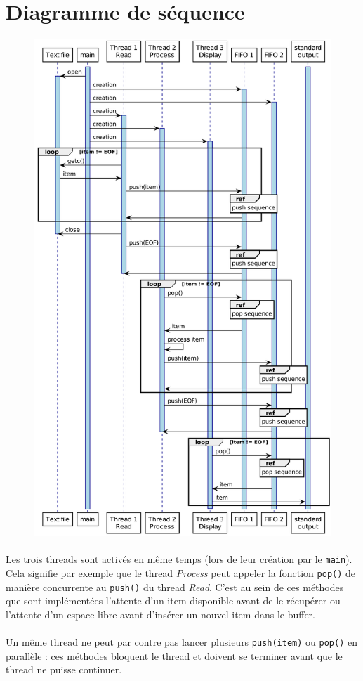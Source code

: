 \documentclass{article}
\begin{document}
    \newpage
    \section{Diagramme de séquence}

    \begin{figure}[H]
        \centering
        \includegraphics[width=.65\textwidth]{./diagrammes/sequence_full/prodcon-full-sequence.png}
    \end{figure}

    \paragraph{}
    Les trois threads sont activés en même temps (lors de leur création par le \texttt{main}). Cela signifie par exemple que le thread \emph{Process} peut appeler la fonction \texttt{pop()} de manière concurrente au \texttt{push()} du thread \emph{Read}. C'est au sein de ces méthodes que sont implémentées l'attente d'un item disponible avant de le récupérer ou l'attente d'un espace libre avant d'insérer un nouvel item dans le buffer.

    \paragraph{}
    Un même thread ne peut par contre pas lancer plusieurs \texttt{push(item)} ou \texttt{pop()} en parallèle : ces méthodes bloquent le thread et doivent se terminer avant que le thread ne puisse continuer.
\end{document}
